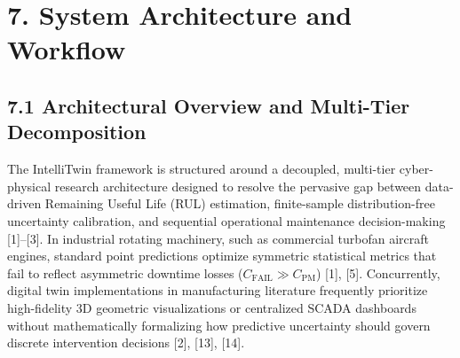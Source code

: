 \documentclass[12pt,a4paper]{article}
\begin{document}
\section*{7. System Architecture and Workflow}

\subsection*{7.1 Architectural Overview and Multi-Tier Decomposition}
The IntelliTwin framework is structured around a decoupled, multi-tier cyber-physical research architecture designed to resolve the pervasive gap between data-driven Remaining Useful Life (RUL) estimation, finite-sample distribution-free uncertainty calibration, and sequential operational maintenance decision-making [1]--[3]. In industrial rotating machinery, such as commercial turbofan aircraft engines, standard point predictions optimize symmetric statistical metrics that fail to reflect asymmetric downtime losses ($C_{\text{FAIL}} \gg C_{\text{PM}}$) [1], [5]. Concurrently, digital twin implementations in manufacturing literature frequently prioritize high-fidelity 3D geometric visualizations or centralized SCADA dashboards without mathematically formalizing how predictive uncertainty should govern discrete intervention decisions [2], [13], [14].
\end{document}
